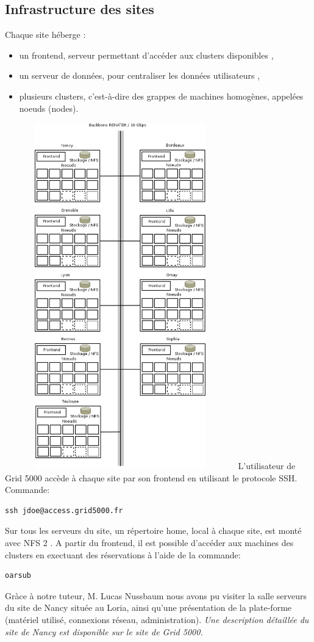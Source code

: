 \documentclass[a4paper,11pt]{report}
\begin{document}
  \subsection{Infrastructure des sites}
Chaque site héberge :
\begin{itemize}
\item un frontend, serveur permettant d'accéder aux clusters disponibles ,
\item un serveur de données, pour centraliser les données utilisateurs ,
\item plusieurs clusters, c'est-à-dire des grappes de machines homogènes, appelées noeuds (nodes).
\end{itemize}
\includegraphics[width=10cm,height=15cm]{g5k1.png}
L'utilisateur de Grid 5000 accède à chaque site par son frontend en utilisant le protocole SSH.\\
Commande:
\begin{lstlisting}
ssh jdoe@access.grid5000.fr
\end{lstlisting}
Sur tous les serveurs du site, un répertoire home, local à chaque site, est monté avec NFS 2 .
A partir du frontend, il est possible d'accéder aux machines des clusters en exectuant des réservations à l'aide de la commande:
\begin{lstlisting}
oarsub
\end{lstlisting}
Gràce à notre tuteur, M. Lucas Nussbaum nous avons pu visiter la salle serveurs du site de Nancy située au Loria, 
ainsi qu'une présentation de la plate-forme (matériel utilisé, connexions réseau,
administration).
\quotation\textit{Une description détaillée du site de Nancy est disponible sur le site de Grid 5000.}
\end{document}
